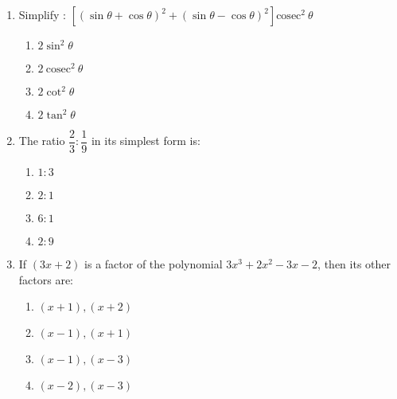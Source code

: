 \begin{enumerate}[label=(\roman*)]

    \item Simplify : $[(\sin \theta + \cos \theta)^2 + 
        (\sin \theta - \cos \theta)^2]\mathrm{cosec}^2 \ \theta$

        \begin{multicols}{2}
        \begin{enumerate}[label=(\alph*)]
            \item $2 \sin^2 \theta$
            \item $2 \ \mathrm{cosec}^2 \ \theta$
            \item $2 \cot^2 \theta$
            \item $2 \tan^2 \theta$
        \end{enumerate}
        \end{multicols}

    \item The ratio $\dfrac23 : \dfrac19$ in its simplest form is: 

        \begin{multicols}{2}
        \begin{enumerate}[label=(\alph*)]
            \item $1:3$ 
            \item $2:1$ 
            \item $6:1$ 
            \item $2:9$ 
        \end{enumerate}
        \end{multicols}

    \item If $(3x+2)$ is a factor of the polynomial 
        $3x^3 + 2x^2 - 3x - 2$, then its other factors are:

        \begin{multicols}{2}
        \begin{enumerate}[label=(\alph*)]
            \item $(x+1),(x+2)$ 
            \item $(x-1),(x+1)$ 
            \item $(x-1),(x-3)$ 
            \item $(x-2),(x-3)$ 
        \end{enumerate}
        \end{multicols}


\end{enumerate}
